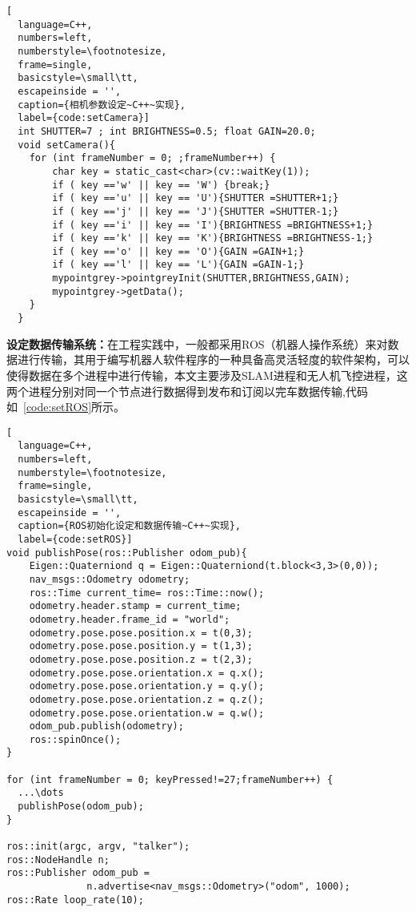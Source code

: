 \begin{lstlisting}[
  language=C++,
  numbers=left,                
  numberstyle=\footnotesize,
  frame=single,     
  basicstyle=\small\tt,    
  escapeinside = '',
  caption={相机参数设定~C++~实现},
  label={code:setCamera}]
  int SHUTTER=7 ; int BRIGHTNESS=0.5; float GAIN=20.0;
  void setCamera(){
    for (int frameNumber = 0; ;frameNumber++) {
        char key = static_cast<char>(cv::waitKey(1));
        if ( key =='w' || key == 'W') {break;}
        if ( key =='u' || key == 'U'){SHUTTER =SHUTTER+1;}
        if ( key =='j' || key == 'J'){SHUTTER =SHUTTER-1;}
        if ( key =='i' || key == 'I'){BRIGHTNESS =BRIGHTNESS+1;}
        if ( key =='k' || key == 'K'){BRIGHTNESS =BRIGHTNESS-1;}
        if ( key =='o' || key == 'O'){GAIN =GAIN+1;}
        if ( key =='l' || key == 'L'){GAIN =GAIN-1;}
        mypointgrey->pointgreyInit(SHUTTER,BRIGHTNESS,GAIN);
        mypointgrey->getData();
    }
  }
\end{lstlisting}
\textbf{设定数据传输系统：}在工程实践中，一般都采用ROS（机器人操作系统）来对数据进行传输，其用于编写机器人软件程序的一种具备高灵活轻度的软件架构，可以使得数据在多个进程中进行传输，本文主要涉及SLAM进程和无人机飞控进程，这两个进程分别对同一个节点进行数据得到发布和订阅以完车数据传输,代码如~\ref{code:setROS}所示。
\begin{lstlisting}[
  language=C++,
  numbers=left,                
  numberstyle=\footnotesize,
  frame=single,     
  basicstyle=\small\tt,    
  escapeinside = '',
  caption={ROS初始化设定和数据传输~C++~实现},
  label={code:setROS}]
void publishPose(ros::Publisher odom_pub){
    Eigen::Quaterniond q = Eigen::Quaterniond(t.block<3,3>(0,0));      
    nav_msgs::Odometry odometry;
    ros::Time current_time= ros::Time::now();
    odometry.header.stamp = current_time;
    odometry.header.frame_id = "world";
    odometry.pose.pose.position.x = t(0,3);
    odometry.pose.pose.position.y = t(1,3);
    odometry.pose.pose.position.z = t(2,3);
    odometry.pose.pose.orientation.x = q.x();
    odometry.pose.pose.orientation.y = q.y();
    odometry.pose.pose.orientation.z = q.z();
    odometry.pose.pose.orientation.w = q.w();
    odom_pub.publish(odometry);  
    ros::spinOnce();        
}

for (int frameNumber = 0; keyPressed!=27;frameNumber++) {
  ...\dots
  publishPose(odom_pub);   
}

ros::init(argc, argv, "talker");  
ros::NodeHandle n;  
ros::Publisher odom_pub = 
              n.advertise<nav_msgs::Odometry>("odom", 1000);      
ros::Rate loop_rate(10);  
\end{lstlisting}

